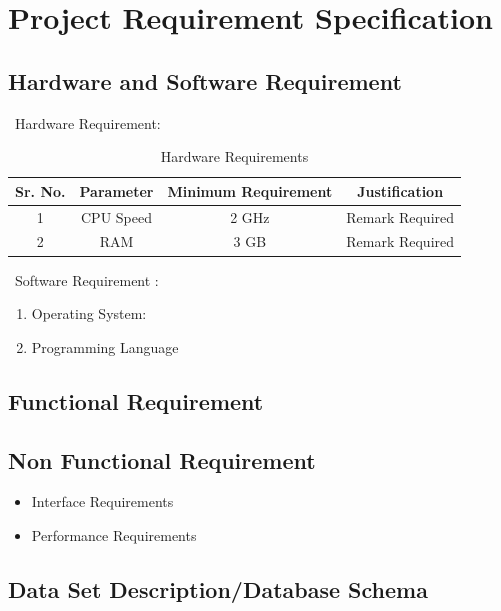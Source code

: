\documentclass[oneside,a4paper,12pt]{report}
\begin{document}
{\chapter{Project Requirement Specification  }

\section{Hardware and Software Requirement }
\ Hardware Requirement:

\begin{table}[!htbp]
\begin{center}
\def\arraystretch{1.5}
  \begin{tabular}{| c | c | c | c |}
\hline
Sr. No. &	Parameter &	Minimum Requirement & Justification \\
\hline
1 &	CPU Speed &	 2 GHz  & Remark Required\\
\hline
2 &	RAM  &	3 GB &  Remark Required\\
 \hline
\end{tabular}
 \caption { Hardware Requirements }
 \label{tab:hreq}
\end{center}

\end{table}


\ Software Requirement : 
\begin{enumerate}
\item Operating System: 
\item Programming Language
\end{enumerate}


\section{Functional Requirement}

\section{Non Functional Requirement }
\begin{itemize}
	\item	Interface Requirements
	\item	Performance Requirements
   
\end{itemize} 

\section{Data Set Description/Database Schema }
  

}
\end{document}
